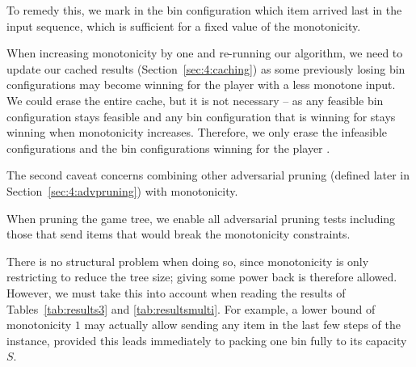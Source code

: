 To remedy this, we mark in the bin configuration which item arrived
last in the input sequence, which is sufficient for a fixed value of
the monotonicity.

When increasing monotonicity by one and re-running our algorithm, we
need to update our cached results (Section~\ref{sec:4:caching}) as
some previously losing bin configurations may become winning for the
player \adversary with a less monotone input. We could erase the
entire cache, but it is not necessary -- as any feasible bin
configuration stays feasible and any bin configuration that is winning
for \adversary stays winning when monotonicity increases. Therefore,
we only erase the infeasible configurations and the bin configurations
winning for the player \algo.

The second caveat concerns combining other adversarial pruning
(defined later in Section~\ref{sec:4:advpruning}) with monotonicity.

When pruning the game tree, we enable all adversarial pruning tests
including those that send items that would break the monotonicity
constraints.

There is no structural problem when doing so, since monotonicity is
only restricting \adversary to reduce the tree size; giving \adversary
some power back is therefore allowed. However, we must take this into
account when reading the results of Tables~\ref{tab:results3} and
\ref{tab:resultsmulti}. For example, a lower bound of monotonicity $1$
may actually allow sending any item in the last few steps of the
instance, provided this leads immediately to \algo packing one bin
fully to its capacity $S$.

